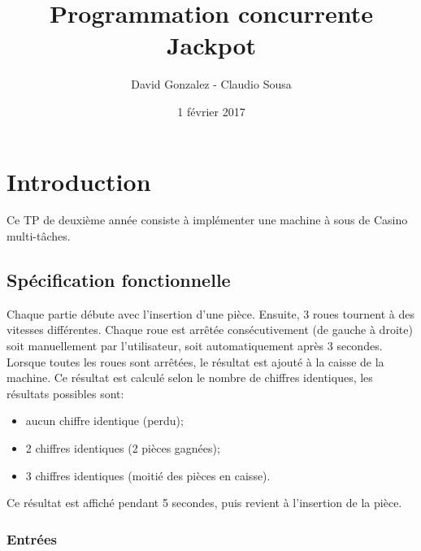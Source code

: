 \documentclass[11pt, a4paper]{article}
\begin{document}
\title
{
    \Huge{Programmation concurrente} \\
    \Huge{Jackpot}
}
\author
{
    \LARGE{David Gonzalez - Claudio Sousa}
}
\date{1 février 2017}
\maketitle

\begin{center}
\end{center}

\thispagestyle{empty}

\newpage

\section{Introduction}

Ce TP de deuxième année consiste à implémenter une machine à sous de Casino multi-tâches.

\subsection{Spécification fonctionnelle}

Chaque partie débute avec l'insertion d'une pièce.
Ensuite, 3 roues tournent à des vitesses différentes.
Chaque roue est arrêtée consécutivement (de gauche à droite)
soit manuellement par l'utilisateur, soit automatiquement après 3 secondes. \\

Lorsque toutes les roues sont arrêtées, le résultat est ajouté à la caisse de la machine.
Ce résultat est calculé selon le nombre de chiffres identiques, les résultats possibles sont:
\begin{itemize}
    \item aucun chiffre identique (perdu);
    \item 2 chiffres identiques (2 pièces gagnées);
    \item 3 chiffres identiques (moitié des pièces en caisse). \\
\end{itemize}

Ce résultat est affiché pendant 5 secondes, puis revient à l'insertion de la pièce.

\subsubsection{Entrées}
\end{document}
